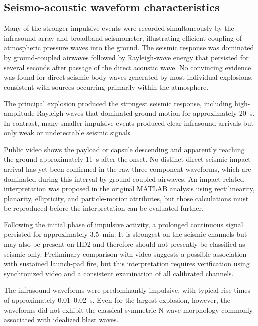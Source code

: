 \documentclass[]{seismica}
\begin{document}
\subsection{Seismo-acoustic waveform characteristics}
\label{sec:results_waveforms}

Many of the stronger impulsive events were recorded simultaneously by the
infrasound array and broadband seismometer, illustrating efficient coupling of
atmospheric pressure waves into the ground. The seismic response was dominated by ground-coupled airwaves followed by Rayleigh-wave energy that persisted for several seconds after passage of the direct acoustic wave. No convincing evidence was found for direct seismic body waves generated by most individual explosions, consistent with sources occurring primarily within the atmosphere.

The principal explosion produced the strongest seismic response, including high-amplitude Rayleigh waves that dominated ground motion for approximately 20~s. In contrast, many smaller impulsive events produced clear infrasound arrivals but only weak or undetectable seismic signals.

Public video shows the payload or capsule descending and apparently reaching
the ground approximately 11~s after the onset. No distinct direct seismic
impact arrival has yet been confirmed in the raw three-component waveforms,
which are dominated during this interval by ground-coupled airwaves. An
impact-related interpretation was proposed in the original MATLAB analysis
using rectilinearity, planarity, ellipticity, and particle-motion attributes,
but those calculations must be reproduced before the interpretation can be
evaluated further.

Following the initial phase of impulsive activity, a prolonged continuous
signal persisted for approximately 3.5~min. It is strongest on the seismic
channels but may also be present on HD2 and therefore should not presently be
classified as seismic-only. Preliminary comparison with video suggests a
possible association with sustained launch-pad fire, but this interpretation
requires verification using synchronized video and a consistent examination of
all calibrated channels.

The infrasound waveforms were predominantly impulsive, with typical rise times of approximately 0.01--0.02~s. Even for the largest explosion, however, the waveforms did not exhibit the classical symmetric N-wave morphology commonly associated with idealized blast waves.
\end{document}
